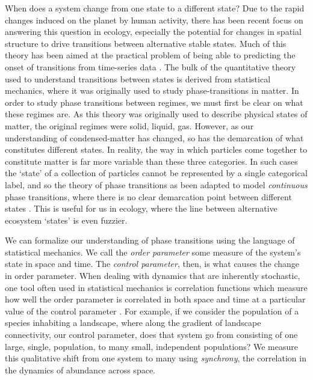\documentclass[]{article}
\begin{document}
When does a system change from one state to a different state? Due to
the rapid changes induced on the planet by human activity, there has
been recent focus on answering this question in ecology, especially the
potential for changes in spatial structure to drive transitions between
alternative stable states. Much of this theory has been aimed at the
practical problem of being able to predicting the onset of transitions
from time-series data \cite{scheffer_anticipating_2012, scheffer_early-warning_2009}. The bulk of the quantitative theory
used to understand transitions between states is derived from
statistical mechanics, where it was originally used to study
phase-transitions in matter. In order to study phase transitions between
regimes, we must first be clear on what these regimes are. As this
theory was originally used to describe physical states of matter, the
original regimes were solid, liquid, gas. However, as our understanding
of condensed-matter has changed, so has the demarcation of what
constitutes different states. In reality, the way in which particles
come together to constitute matter is far more variable than these three
categories. In such cases the `state' of a collection of particles
cannot be represented by a single categorical label, and so the theory
of phase transitions as been adapted to model \emph{continuous} phase
transitions, where there is no clear demarcation point between different
states \cite{sethna_statistical_2006}. This is useful for us in ecology,
where the line between alternative ecosystem `states' is even fuzzier.

We can formalize our understanding of phase transitions using the
language of statistical mechanics. We call the \emph{order parameter}
some measure of the system's state in space and time. The \emph{control
parameter}, then, is what causes the change in order parameter. When
dealing with dynamics that are inherently stochastic, one tool often
used in statistical mechanics is correlation functions which measure how
well the order parameter is correlated in both space and time at a
particular value of the control parameter \cite{sethna_statistical_2006}.
For example, if we consider the population of a species inhabiting a
landscape, where along the gradient of landscape connectivity, our
control parameter, does that system go from consisting of one large,
single, population, to many small, independent populations? We measure
this qualitative shift from one system to many using \emph{synchrony},
the correlation in the dynamics of abundance across space.
\end{document}
